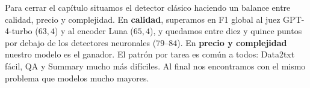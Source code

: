 \documentclass[12pt,a4paper]{report}
\theoremstyle{definition}
\begin{document}
Para cerrar el capítulo situamos el detector clásico haciendo un balance entre calidad, precio y complejidad. En \textbf{calidad}, superamos en F1
global al juez GPT-4-turbo ($63{,}4$) y al encoder Luna ($65{,}4$), y quedamos entre diez y
quince puntos por debajo de los detectores neuronales ($79$--$84$). En \textbf{precio
y complejidad} nuestro modelo es el ganador. El patrón por tarea
es común a todos: Data2txt fácil, QA y Summary mucho más difíciles. Al final nos encontramos con el mismo problema que modelos mucho mayores.



\end{document}
